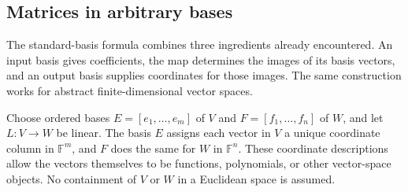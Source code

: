 \subsection{Matrices in arbitrary bases}

The standard-basis formula combines three ingredients already encountered.
An input basis gives coefficients, the map determines the images of its
basis vectors, and an output basis supplies coordinates for those images.
The same construction works for abstract finite-dimensional vector spaces.

Choose ordered bases \(E=[e_1,\ldots,e_m]\) of \(V\) and
\(F=[f_1,\ldots,f_n]\) of \(W\), and let \(L:V\to W\) be linear.
The basis \(E\) assigns each vector in \(V\) a unique coordinate column
in \(\mathbb F^m\), and \(F\) does the same for \(W\) in
\(\mathbb F^n\). These coordinate descriptions allow the vectors
themselves to be functions, polynomials, or other vector-space objects.
No containment of \(V\) or \(W\) in a Euclidean space is assumed.

